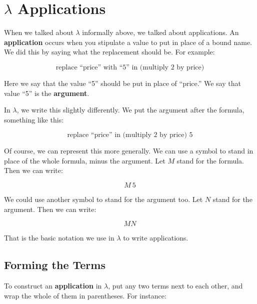 \documentclass{book}
\numberwithin{equation}{chapter}
\newcommand{\vocab}{\textbf}
\begin{document}
\chapter{$\lambda$ Applications}

When we talked about $\lambda$ informally above, we talked about applications. An \vocab{application} occurs when you stipulate a value to put in place of a bound name. We did this by saying what the replacement should be. For example:

\begin{equation}
\text{replace ``price'' with ``5'' in (multiply 2 by price)}
\end{equation}

\noindent
Here we say that the value ``5'' should be put in place of ``price.'' We say that value ``5'' is the \vocab{argument}.

In $\lambda$, we write this slightly differently. We put the argument after the formula, something like this:

\begin{equation}
\text{replace ``price'' in (multiply 2 by price) 5}
\end{equation}

\noindent
Of course, we can represent this more generally. We can use a symbol to stand in place of the whole formula, minus the argument. Let $M$ stand for the formula. Then we can write:

\begin{equation}
M~5
\end{equation}

\noindent
We could use another symbol to stand for the argument too. Let $N$ stand for the argument. Then we can write:

\begin{equation}
M N
\end{equation}

\noindent
That is the basic notation we use in $\lambda$ to write applications.


\section{Forming the Terms}

To construct an \vocab{application} in $\lambda$, put any two terms next to each other, and wrap the whole of them in parentheses. For instance:
\end{document}
